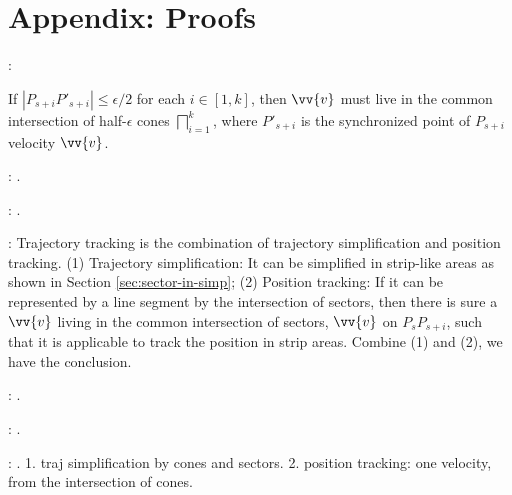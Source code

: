 \section*{{Appendix:  Proofs}}





:

If $|P_{s+i}P'_{s+i}|\le \epsilon/2$ for each $i \in [1,k]$, then $\vv{v}$ must live in the common intersection of half-$\epsilon$ cones $\bigsqcap_{i=1}^{k}$, where $P'_{s+i}$ is the synchronized point of $P_{s+i}$ \wrt velocity $\vv{v}$.
\eop

:
\todo.
\eop

:
\todo.
\eop

:
Trajectory tracking is the combination of trajectory simplification and position tracking.
%
(1) Trajectory simplification: It can be simplified in strip-like areas as shown in Section \ref{sec:sector-in-simp};
%
(2) Position tracking: If it can be represented by a line segment by the intersection of sectors, then there is sure a $\vv{v}$ living in the common intersection of sectors, \eg $\vv{v}$ on $P_sP_{s+i}$, such that it is applicable to track the position in strip areas.
%
Combine (1) and (2), we have the conclusion.
\eop

:
\todo.
\eop

:
\todo.
\eop

:
\todo.
1. traj simplification by cones and sectors.
2. position tracking: one velocity, from the intersection of cones.
\eop


